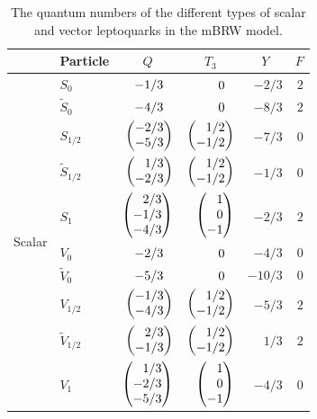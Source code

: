 \documentclass[12pt]{thesis}  %
\makeatletter
\newcommand\triplet[4][c]{\left(%
        \begin{array}{@{}#1@{}}#2\\#3\\#4%
\end{array}%
\right)%
}
\newcommand\doublet[3][c]{\left(%
        \begin{array}{@{}#1@{}}#2\\#3%
\end{array}%
\right)%
}
\makeatother
\begin{document}
\begin{table}[htb]
  \begin{center}
    \begin{tabular}{|l||l|r|r|r|r|}
\hline
      & \multicolumn{1}{c|}{Particle} & \multicolumn{1}{c|}{$Q$} & \multicolumn{1}{c|}{$T_3$} & \multicolumn{1}{c|}{$Y$} & \multicolumn{1}{c|}{$F$} \\
\hline
\hline
\multirow{10}{*}{Scalar} & $S_{0}$               & $-1/3\hphantom{\bigg)}$                            & $0\hphantom{\bigg)}$                              & $-2/3$ & $2$ \\
                         & $\widetilde{S}_{0}$   & $-4/3\hphantom{\bigg)}$                            & $0\hphantom{\bigg)}$                              & $-8/3$ & $2$ \\
\rule{0pt}{24pt}         & $S_{1/2}$             & $\doublet[r]{-2/3}{-5/3}$ & $\doublet[r]{1/2}{-1/2}$ & $-7/3$ & $0$ \\
\rule{0pt}{24pt}         & $\widetilde{S}_{1/2}$ & $\doublet[r]{1/3}{-2/3}$  & $\doublet[r]{1/2}{-1/2}$ & $-1/3$ & $0$ \\
\rule{0pt}{36pt}         & $S_{1}$               & $\triplet[r]{2/3}{-1/3}{-4/3}$       & $\triplet[r]{1\vphantom{/}}{0\vphantom{/}}{-1\vphantom{/}}$             & $-2/3$ & $2$ \\
\hline
\hline
\multirow{10}{*}{Vector} & $V_{0}$               & $-2/3\hphantom{\bigg)}$                            & $0\hphantom{\bigg)}$                              & $-4/3$  & $0$ \\
                         & $\widetilde{V}_{0}$   & $-5/3\hphantom{\bigg)}$                            & $0\hphantom{\bigg)}$                              & $-10/3$ & $0$ \\
\rule{0pt}{24pt}         & $V_{1/2}$             & $\doublet[r]{-1/3}{-4/3}$ & $\doublet[r]{1/2}{-1/2}$ & $-5/3$  & $2$ \\
\rule{0pt}{24pt}         & $\widetilde{V}_{1/2}$ & $\doublet[r]{2/3}{-1/3}$  & $\doublet[r]{1/2}{-1/2}$ & $1/3$   & $2$ \\
\rule{0pt}{36pt}         & $V_{1}$               & $\triplet[r]{1/3}{-2/3}{-5/3}$       & $\triplet[r]{1\vphantom{/}}{0\vphantom{/}}{-1\vphantom{/}}$             & $-4/3$  & $0$ \\
\hline
    \end{tabular}
    \caption{The quantum numbers of the different types of scalar and vector leptoquarks in the mBRW model.}
    \label{tab:lq-num}
  \end{center}
\end{table}
\end{document}
